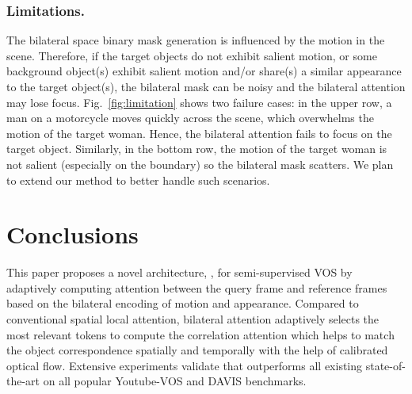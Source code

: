 \documentclass[runningheads]{llncs}
\begin{document}
\subsubsection{Limitations.}
The bilateral space binary mask generation is influenced by the motion in the scene. Therefore, if the target objects do not exhibit salient motion, or some background object(s) exhibit salient motion and/or share(s) a similar appearance to the target object(s), the bilateral mask can be noisy and the bilateral attention may lose focus. Fig.~\ref{fig:limitation} shows two failure cases: in the upper row, a man on a motorcycle moves quickly across the scene, which overwhelms the motion of the target woman. Hence, the bilateral attention fails to focus on the target object. Similarly, in the bottom row, the motion of the target woman is not salient (especially on the boundary) so the bilateral mask scatters. We plan to extend our method to better handle such scenarios.


\section{Conclusions}
This paper proposes a novel architecture, {\shortname}, for semi-supervised VOS by adaptively computing attention between the query frame and reference frames based on the bilateral encoding of motion and appearance. Compared to conventional spatial local attention, bilateral attention adaptively selects the most relevant tokens to compute the correlation attention which helps to match the object correspondence spatially and temporally with the help of calibrated optical flow. Extensive experiments validate that {\shortname} outperforms all existing state-of-the-art on all popular Youtube-VOS and DAVIS benchmarks.
\end{document}
